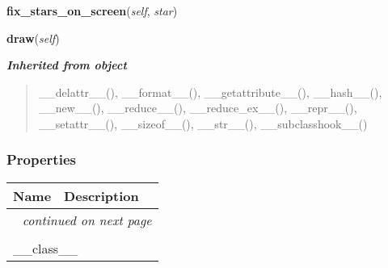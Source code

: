     \vspace{0.5ex}

\hspace{.8\funcindent}\begin{boxedminipage}{\funcwidth}

    \raggedright \textbf{fix\_stars\_on\_screen}(\textit{self}, \textit{star})

\setlength{\parskip}{2ex}
\setlength{\parskip}{1ex}
    \end{boxedminipage}

    \label{pygame-asteroids:start_field:StarField:draw}

    \vspace{0.5ex}

\hspace{.8\funcindent}\begin{boxedminipage}{\funcwidth}

    \raggedright \textbf{draw}(\textit{self})

\setlength{\parskip}{2ex}
\setlength{\parskip}{1ex}
    \end{boxedminipage}


\large{\textbf{\textit{Inherited from object}}}

\begin{quote}
\_\_delattr\_\_(), \_\_format\_\_(), \_\_getattribute\_\_(), \_\_hash\_\_(), \_\_new\_\_(), \_\_reduce\_\_(), \_\_reduce\_ex\_\_(), \_\_repr\_\_(), \_\_setattr\_\_(), \_\_sizeof\_\_(), \_\_str\_\_(), \_\_subclasshook\_\_()
\end{quote}


  \subsubsection{Properties}

    \vspace{-1cm}
\hspace{\varindent}\begin{longtable}{|p{\varnamewidth}|p{\vardescrwidth}|l}
\cline{1-2}
\cline{1-2} \centering \textbf{Name} & \centering \textbf{Description}& \\
\cline{1-2}
\endhead\cline{1-2}\multicolumn{3}{r}{\small\textit{continued on next page}}\\\endfoot\cline{1-2}
\endlastfoot\multicolumn{2}{|l|}{\textit{Inherited from object}}\\
\multicolumn{2}{|p{\varwidth}|}{\raggedright \_\_class\_\_}\\
\cline{1-2}
\end{longtable}


